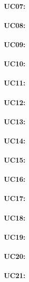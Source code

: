 \paragraph{UC07: }
\paragraph{UC08: }
\paragraph{UC09: }
\paragraph{UC10: }
\paragraph{UC11: }
\paragraph{UC12: }
\paragraph{UC13: }
\paragraph{UC14: }
\paragraph{UC15: }
\paragraph{UC16: }
\paragraph{UC17: }
\paragraph{UC18: }
\paragraph{UC19: }
\paragraph{UC20: }
\paragraph{UC21: }
